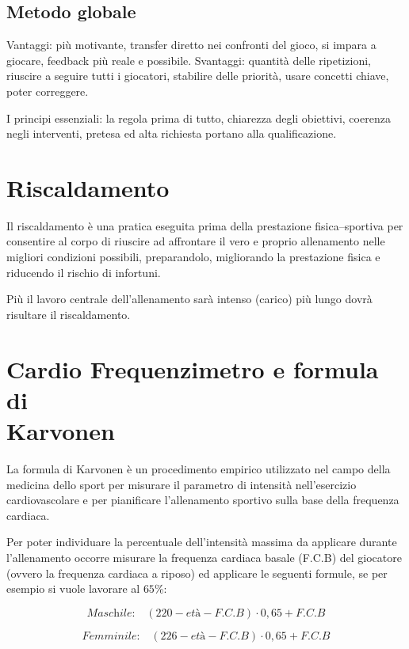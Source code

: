 \subsection{Metodo globale}
Vantaggi: più motivante, transfer diretto nei confronti del gioco, si impara a giocare, feedback più reale e possibile. 
Svantaggi: quantità delle ripetizioni, riuscire a seguire tutti i giocatori, stabilire delle priorità, usare concetti chiave, poter correggere.

I principi essenziali:
la regola prima di tutto,
chiarezza degli obiettivi,
coerenza negli interventi,
pretesa ed alta richiesta portano alla qualificazione.

\section{Riscaldamento}
Il riscaldamento è una pratica eseguita prima della prestazione fisica--sportiva per consentire al corpo di riuscire ad affrontare il vero e proprio allenamento nelle migliori condizioni possibili, preparandolo, migliorando la prestazione fisica e riducendo il rischio di infortuni.

Più il lavoro centrale dell'allenamento  sarà intenso (carico) più lungo
dovrà risultare il riscaldamento.

\section{Cardio Frequenzimetro e formula di\\ Karvonen}
La formula di Karvonen è un procedimento empirico utilizzato nel campo della medicina dello sport per misurare il parametro di intensità nell'esercizio cardiovascolare e per pianificare l'allenamento sportivo sulla base della frequenza cardiaca.

Per poter individuare la percentuale dell'intensità massima da applicare durante l'allenamento occorre misurare la frequenza cardiaca basale (F.C.B) del giocatore
(ovvero la frequenza cardiaca a riposo) ed applicare le seguenti formule,
se per esempio si vuole lavorare al $65$\%:
\begin{flushleft}
 \[
\textit{Maschile:} \quad
 \left( 220 - \textit{età} - \textit{F.C.B} \right) \cdot 0,65 + \textit{F.C.B}
 \]
\end{flushleft}
\begin{flushleft}
 \[
\textit{Femminile:} \quad
 \left( 226 - \textit{età} - \textit{F.C.B} \right) \cdot 0,65 + \textit{F.C.B}
 \]
\end{flushleft}